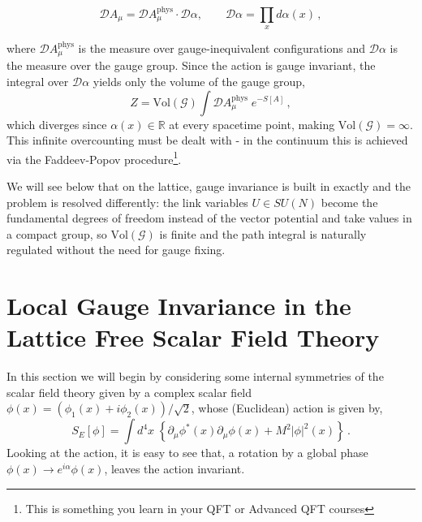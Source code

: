 \documentclass[11pt]{article}
\theoremstyle{definition}
\begin{document}
\begin{equation}
    \mathcal{D}A_\mu = \mathcal{D}A^{\mathrm{phys}}_\mu \cdot \mathcal{D}\alpha, 
    \qquad 
    \mathcal{D}\alpha = \prod_x d\alpha(x)\,,
\end{equation}

where $\mathcal{D}A^{\mathrm{phys}}_\mu$ is the measure over gauge-inequivalent 
configurations and $\mathcal{D}\alpha$ is the measure over the gauge group. Since 
the action is gauge invariant, the integral over $\mathcal{D}\alpha$ yields only 
the volume of the gauge group,
%
\begin{equation}
    Z = \mathrm{Vol}(\mathcal{G}) \int \mathcal{D}A^{\mathrm{phys}}_\mu \; e^{-S[A]}\,,
\end{equation}
%
which diverges since $\alpha(x) \in \mathbb{R}$ at every spacetime point, making 
$\mathrm{Vol}(\mathcal{G}) = \infty$. This infinite overcounting must be dealt 
with - in the continuum this is achieved via the Faddeev-Popov procedure\footnote{This is something you learn in your QFT or Advanced QFT courses}. 

We will see below that on the lattice, gauge invariance is built in exactly and the problem is resolved differently: the link variables $U \in SU(N)$ become the fundamental degrees of freedom instead of the vector potential and take values in a compact group, so $\mathrm{Vol}(\mathcal{G})$ is finite and the path integral is naturally 
regulated without the need for gauge fixing.

\section{Local Gauge Invariance in the Lattice Free Scalar Field Theory}
In this section we will begin by considering some internal symmetries of the scalar field theory given by a complex scalar field $\phi(x) = \left( \phi_1(x) + i \phi_2(x) \right)/\sqrt{2}$, whose (Euclidean) action is given by, 
\begin{equation}
    S_E[\phi] = \int d^4 x \; \left\{  \partial_{\mu}\phi^*(x)\partial_{\mu}\phi(x) + M^2  |\phi|^2(x) \right\}\,.
\end{equation}
Looking at the action, it is easy to see that, a rotation by a global phase $\phi(x) \to e^{i \alpha}\phi(x)$, leaves the action invariant. 
\end{document}
